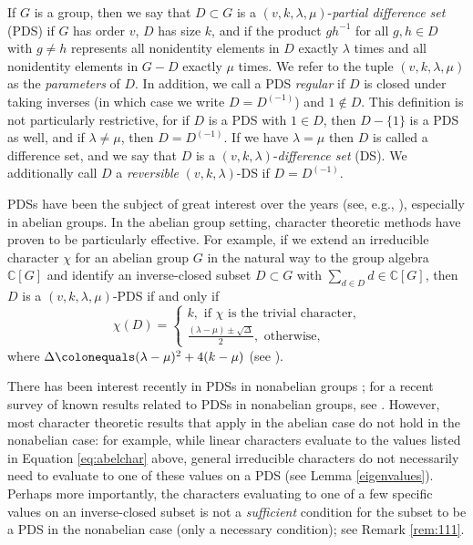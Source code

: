 \documentclass[12pt]{amsproc} %
\theoremstyle{definition}\newtheorem{defn}[thm]{Definition}
\theoremstyle{definition}\newtheorem{rem}[thm]{Remark}
\theoremstyle{definition}\newtheorem{ex}[thm]{Example}
\newcommand{\C}{\mathbb{C}}
\begin{document}
If $G$ is a group, then we say that $D \subset G$ is a $(v, k, \lambda, \mu)$-\textit{partial difference set} (PDS) if $G$ has order $v$, $D$ has size $k$, and if the product $gh^{-1}$ for all $g, h \in D$ with $g \neq h$ represents all nonidentity elements in $D$ exactly $\lambda$ times and all nonidentity elements in $G - D$ exactly $\mu$ times. We refer to the tuple $(v, k, \lambda, \mu)$ as the {\it parameters} of $D$. In addition, we call a PDS {\it regular} if $D$ is closed under taking inverses (in which case we write $D = D^{(-1)}$) and $1 \not \in D$. This definition is not particularly restrictive, for if $D$ is a PDS with $1 \in D$, then $D - \{1\}$ is a PDS as well, and if $\lambda \neq \mu$, then $D = D^{(-1)}$. If we have $\lambda = \mu$ then $D$ is called a difference set, and we say that $D$ is a $(v, k, \lambda)$-\textit{difference set} (DS). We additionally call $D$ a \textit{reversible} $(v, k, \lambda)$-DS if $D = D^{(-1)}$.

PDSs have been the subject of great interest over the years (see, e.g., \cite{ma}), especially in abelian groups.  In the abelian group setting, character theoretic methods have proven to be particularly effective.  For example, if we extend an irreducible character $\chi$ for an abelian group $G$ in the natural way to the group algebra $\C[G]$ and identify an inverse-closed subset $D \subset G$ with $\sum_{d \in D} d \in \C[G]$, then $D$ is a $(v, k, \lambda, \mu)$-PDS if and only if
\begin{equation}
\label{eq:abelchar}
\chi(D) = \begin{cases}
              k, \text{ if $\chi$ is the trivial character,}\\
              \frac{(\lambda-\mu) \pm \sqrt{\Delta}}{2}, \text{ otherwise,}
             \end{cases}
\end{equation}
where $\Delta \colonequals (\lambda - \mu)^2 + 4(k - \mu)$ (see \cite[Corollary 3.3]{ma}).

There has been interest recently in PDSs in nonabelian groups \cite{Davis_etal_2023, Feng_He_Chen_2020, Swartz_etal_2024, swartz-tauscheck}; for a recent survey of known results related to PDSs in nonabelian groups, see \cite{pol-dav-smi-swa}. However, most character theoretic results that apply in the abelian case do not hold in the nonabelian case: for example, while linear characters evaluate to the values listed in Equation \eqref{eq:abelchar} above, general irreducible characters do not necessarily need to evaluate to one of these values on a PDS (see Lemma \ref{eigenvalues}). Perhaps more importantly, the characters evaluating to one of a few specific values on an inverse-closed subset is not a \textit{sufficient} condition for the subset to be a PDS in the nonabelian case (only a necessary condition); see Remark \ref{rem:111}. 
\end{document}
